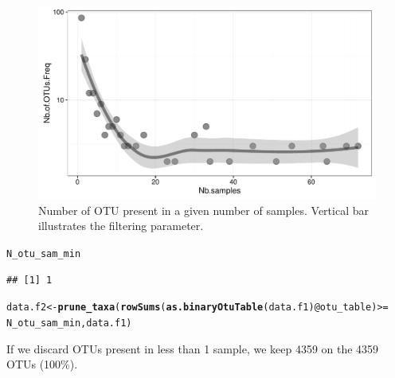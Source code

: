 \documentclass[12pt]{article}\usepackage[]{graphicx}\usepackage[]{color}
\makeatletter
\def\maxwidth{ %
  \ifdim\Gin@nat@width>\linewidth
    \linewidth
  \else
    \Gin@nat@width
  \fi
}
\newcommand{\hlopt}[1]{\textcolor[rgb]{0,0,0}{#1}}%
\newcommand{\hlstd}[1]{\textcolor[rgb]{0.345,0.345,0.345}{#1}}%
\newcommand{\hlkwb}[1]{\textcolor[rgb]{0.69,0.353,0.396}{#1}}%
\newcommand{\hlkwc}[1]{\textcolor[rgb]{0.333,0.667,0.333}{#1}}%
\newcommand{\hlkwd}[1]{\textcolor[rgb]{0.737,0.353,0.396}{\textbf{#1}}}%
\newenvironment{kframe}{%
 \def\at@end@of@kframe{}%
 \ifinner\ifhmode%
  \def\at@end@of@kframe{\end{minipage}}%
  \begin{minipage}{\columnwidth}%
 \fi\fi%
 \def\FrameCommand##1{\hskip\@totalleftmargin \hskip-\fboxsep
 \colorbox{shadecolor}{##1}\hskip-\fboxsep
     \hskip-\linewidth \hskip-\@totalleftmargin \hskip\columnwidth}%
 \MakeFramed {\advance\hsize-\width
   \@totalleftmargin\z@ \linewidth\hsize
   \@setminipage}}%
 {\par\unskip\endMakeFramed%
 \at@end@of@kframe}
\newenvironment{knitrout}{}{} %
\numberwithin{figure}{section}
\makeatother
\begin{document}
\begin{knitrout}
\begin{figure}
{\centering \includegraphics[width=\maxwidth]{figure/nbOtu_sample-1} 

}

\caption[Number of OTU present in a given number of samples]{Number of OTU present in a given number of samples. Vertical bar illustrates the filtering parameter.}\label{fig:nbOtu_sample}
\end{figure}


\end{knitrout}

\begin{knitrout}\small
{}\color{fgcolor}\begin{kframe}
\begin{alltt}
\hlstd{N_otu_sam_min}
\end{alltt}
\begin{verbatim}
## [1] 1
\end{verbatim}
\end{kframe}
\end{knitrout}

\begin{knitrout}\small
{}\color{fgcolor}\begin{kframe}
\begin{alltt}
\hlstd{data.f2} \hlkwb{<-} \hlkwd{prune_taxa}\hlstd{(}\hlkwd{rowSums}\hlstd{(}\hlkwd{as.binaryOtuTable}\hlstd{(data.f1)}\hlopt{@}\hlkwc{otu_table}\hlstd{)} \hlopt{>=}
                        \hlstd{N_otu_sam_min, data.f1)}
\end{alltt}
\end{kframe}
\end{knitrout}

If we discard OTUs present in less than 1 sample, we keep 4359 on the 4359 OTUs (100\%).
\end{document}
